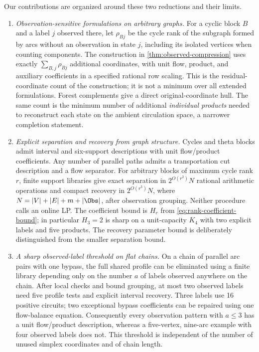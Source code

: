 Our contributions are organized around these two reductions and their limits.
\begin{enumerate}[leftmargin=*,itemsep=5pt]
\item \emph{Observation-sensitive formulations on arbitrary graphs.}
For a cyclic block $B$ and a label $j$ observed there, let $\rho_{Bj}$
be the cycle rank of the subgraph formed by arcs without an observation in
state $j$, including its isolated vertices when counting components.
The construction in \cref{thm:observed-compression} uses exactly
$\sum_{B,j}\rho_{Bj}$ additional coordinates, with unit flow, product,
and auxiliary coefficients in a specified rational row scaling.
This is the residual-coordinate count of the construction; it is not a
minimum over all extended formulations. Forest complements give a direct
original-coordinate hull. The same count is the minimum number of additional
\emph{individual products} needed to reconstruct each state on the ambient
circulation space, a narrower completion statement.

\item \emph{Explicit separation and recovery from graph structure.}
Cycles and theta blocks admit interval and six-support descriptions with
unit flow/product coefficients. Any number of parallel paths admits a
transportation cut description and a flow separator. For arbitrary blocks
of maximum cycle rank $r$, finite support libraries give exact separation
in $2^{O(r^2)}N$ rational arithmetic operations and compact recovery in
$2^{O(r^3)}N$, where $N=|V|+|E|+m+|\Obs|$, after observation grouping.
Neither procedure calls an online LP. The coefficient bound is
$H_r$ from \eqref{eq:rank-coefficient-bound}; in particular $H_3=2$ is
sharp on a unit-capacity $K_4$ with two explicit labels and five products.
The recovery parameter bound is deliberately distinguished from the smaller
separation bound.

\item \emph{A sharp observed-label threshold on flat chains.}
On a chain of parallel arc pairs with one bypass, the full shared profile
can be eliminated using a finite library depending only on the number $a$
of labels observed anywhere on the chain. After local checks and bound
grouping, at most two observed labels need five profile tests and explicit
interval recovery. Three labels use
16 positive circuits; two exceptional bypass coefficients can be repaired
using one flow-balance equation. Consequently every observation pattern
with $a\le3$ has a unit flow/product description, whereas a five-vertex,
nine-arc example with four observed labels does not. This threshold is
independent of the number of unused simplex coordinates and of chain length.


\end{enumerate}
